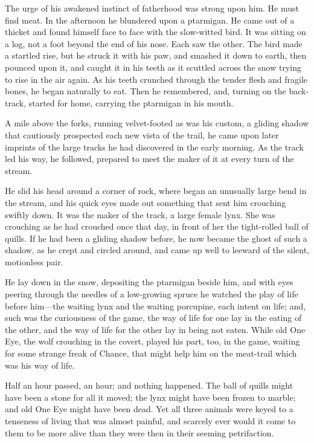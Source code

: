 \documentclass[10pt]{book}
\begin{document}
The urge of his awakened instinct of fatherhood was strong upon him. He
must find meat. In the afternoon he blundered upon a ptarmigan. He came
out of a thicket and found himself face to face with the slow-witted
bird. It was sitting on a log, not a foot beyond the end of his nose.
Each saw the other. The bird made a startled rise, but he struck it
with his paw, and smashed it down to earth, then pounced upon it, and
caught it in his teeth as it scuttled across the snow trying to rise in
the air again. As his teeth crunched through the tender flesh and
fragile bones, he began naturally to eat. Then he remembered, and,
turning on the back-track, started for home, carrying the ptarmigan in
his mouth.

A mile above the forks, running velvet-footed as was his custom, a
gliding shadow that cautiously prospected each new vista of the trail,
he came upon later imprints of the large tracks he had discovered in
the early morning. As the track led his way, he followed, prepared to
meet the maker of it at every turn of the stream.

He slid his head around a corner of rock, where began an unusually
large bend in the stream, and his quick eyes made out something that
sent him crouching swiftly down. It was the maker of the track, a large
female lynx. She was crouching as he had crouched once that day, in
front of her the tight-rolled ball of quills. If he had been a gliding
shadow before, he now became the ghost of such a shadow, as he crept
and circled around, and came up well to leeward of the silent,
motionless pair.

He lay down in the snow, depositing the ptarmigan beside him, and with
eyes peering through the needles of a low-growing spruce he watched the
play of life before him—the waiting lynx and the waiting porcupine,
each intent on life; and, such was the curiousness of the game, the way
of life for one lay in the eating of the other, and the way of life for
the other lay in being not eaten. While old One Eye, the wolf crouching
in the covert, played his part, too, in the game, waiting for some
strange freak of Chance, that might help him on the meat-trail which
was his way of life.

Half an hour passed, an hour; and nothing happened. The ball of quills
might have been a stone for all it moved; the lynx might have been
frozen to marble; and old One Eye might have been dead. Yet all three
animals were keyed to a tenseness of living that was almost painful,
and scarcely ever would it come to them to be more alive than they were
then in their seeming petrifaction.
\end{document}
